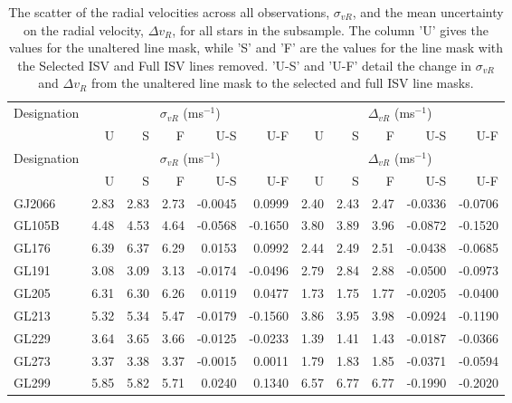 \begin{longtable}{|l||r|r|r|r|r||r|r|r|r|r|}
    \hline
    Designation & \multicolumn{5}{c||}{$\sigma_{vR}$ (ms$^{-1}$)} & \multicolumn{5}{c|}{$\Delta_{vR}$ (ms$^{-1}$)}\\
    \cline{2-11}
     & U & S & F & U-S & U-F & U & S & F & U-S & U-F\\
     \hline
     \endfirsthead
     
    \hline
    Designation & \multicolumn{5}{c||}{$\sigma_{vR}$ (ms$^{-1}$)} & \multicolumn{5}{c|}{$\Delta_{vR}$ (ms$^{-1}$)}\\
    \cline{2-11}
     & U & S & F & U-S & U-F & U & S & F & U-S & U-F\\
     \hline
     \endhead
    
    \hline
    \endfoot
    
    \hline
    \caption{The scatter of the radial velocities across all observations, $\sigma_{vR}$, and the mean uncertainty on the radial velocity, $\Delta v_R$, for all stars in the subsample. The column 'U' gives the values for the unaltered line mask, while 'S' and 'F' are the values for the line mask with the Selected ISV and Full ISV lines removed. 'U-S' and 'U-F' detail the change in $\sigma_{vR}$ and $\Delta v_R$ from the unaltered line mask to the selected and full ISV line masks.}
\label{tabRVresults}
    \endlastfoot
GJ2066 & 2.83 & 2.83 & 2.73 & -0.0045 & 0.0999 & 2.40 & 2.43 & 2.47 & -0.0336 & -0.0706\\  
GL105B & 4.48 & 4.53 & 4.64 & -0.0568 & -0.1650 & 3.80 & 3.89 & 3.96 & -0.0872 & -0.1520\\   
GL176 & 6.39 & 6.37 & 6.29 & 0.0153 & 0.0992 & 2.44 & 2.49 & 2.51 & -0.0438 & -0.0685\\   
GL191 & 3.08 & 3.09 & 3.13 & -0.0174 & -0.0496 & 2.79 & 2.84 & 2.88 & -0.0500 & -0.0973\\   
GL205 & 6.31 & 6.30 & 6.26 & 0.0119 & 0.0477 & 1.73 & 1.75 & 1.77 & -0.0205 & -0.0400\\      
GL213 & 5.32 & 5.34 & 5.47 & -0.0179 & -0.1560 & 3.86 & 3.95 & 3.98 & -0.0924 & -0.1190\\   
GL229 & 3.64 & 3.65 & 3.66 & -0.0125 & -0.0233 & 1.39 & 1.41 & 1.43 & -0.0187 & -0.0366\\ 
GL273 & 3.37 & 3.38 & 3.37 & -0.0015 & 0.0011 & 1.79 & 1.83 & 1.85 & -0.0371 & -0.0594\\
GL299 & 5.85 & 5.82 & 5.71 & 0.0240 & 0.1340 & 6.57 & 6.77 & 6.77 & -0.1990 & -0.2020\\       

\end{longtable}
